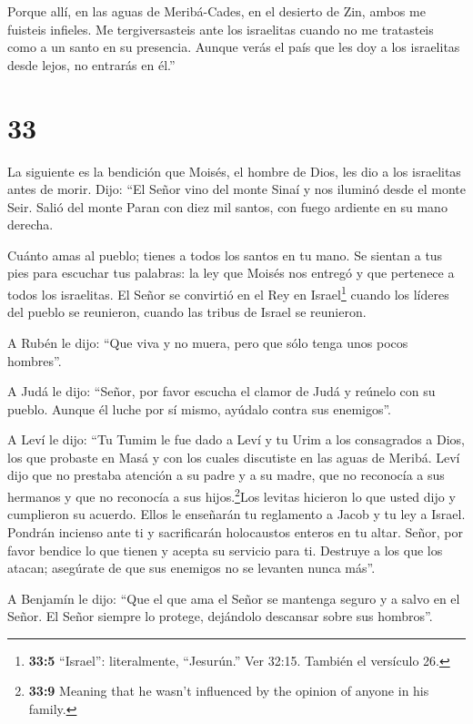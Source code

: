  Porque allí, en las aguas de Meribá-Cades, en el desierto
de Zin, ambos me fuisteis infieles. Me tergiversasteis ante los
israelitas cuando no me tratasteis como a un santo en su presencia.
 Aunque verás el país que les doy a los israelitas desde
lejos, no entrarás en él.''

\hypertarget{section-32}{%
\section{33}\label{section-32}}

 La siguiente es la bendición que Moisés, el hombre de Dios,
les dio a los israelitas antes de morir.  Dijo: ``El Señor
vino del monte Sinaí y nos iluminó desde el monte Seir. Salió del monte
Paran con diez mil santos, con fuego ardiente en su mano derecha.

 Cuánto amas al pueblo; tienes a todos los santos en tu
mano. Se sientan a tus pies para escuchar tus palabras:  la
ley que Moisés nos entregó y que pertenece a todos los israelitas.
 El Señor se convirtió en el Rey en Israel\footnote{\textbf{33:5}
  ``Israel'': literalmente, ``Jesurún.'' Ver 32:15. También el versículo
  26.} cuando los líderes del pueblo se reunieron, cuando las tribus de
Israel se reunieron.

 A Rubén le dijo: ``Que viva y no muera, pero que sólo tenga
unos pocos hombres''.

 A Judá le dijo: ``Señor, por favor escucha el clamor de
Judá y reúnelo con su pueblo. Aunque él luche por sí mismo, ayúdalo
contra sus enemigos''.

 A Leví le dijo: ``Tu Tumim le fue dado a Leví y tu Urim a
los consagrados a Dios, los que probaste en Masá y con los cuales
discutiste en las aguas de Meribá.  Leví dijo que no
prestaba atención a su padre y a su madre, que no reconocía a sus
hermanos y que no reconocía a sus hijos.\footnote{\textbf{33:9} Meaning
  that he wasn't influenced by the opinion of anyone in his family.}Los
levitas hicieron lo que usted dijo y cumplieron su acuerdo.
 Ellos le enseñarán tu reglamento a Jacob y tu ley a
Israel. Pondrán incienso ante ti y sacrificarán holocaustos enteros en
tu altar.  Señor, por favor bendice lo que tienen y acepta
su servicio para ti. Destruye a los que los atacan; asegúrate de que sus
enemigos no se levanten nunca más''.

 A Benjamín le dijo: ``Que el que ama el Señor se mantenga
seguro y a salvo en el Señor. El Señor siempre lo protege, dejándolo
descansar sobre sus hombros''.

